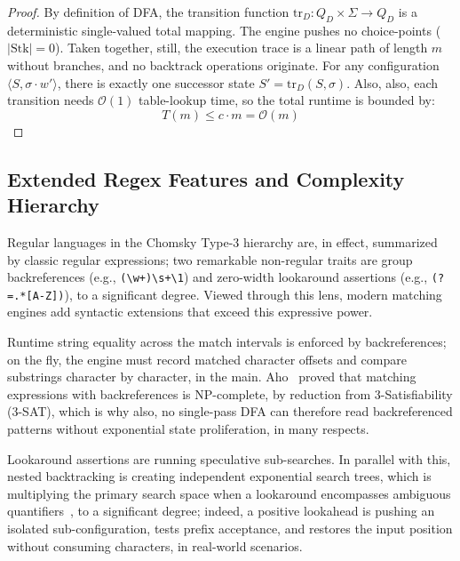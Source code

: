 \documentclass{ieeeaccess}
\begin{document}
\begin{proof}
By definition of DFA, the transition function $\mathrm{tr}_D: Q_D \times \Sigma \to Q_D$ is a deterministic single-valued total mapping. The engine pushes no choice-points ($|\mathrm{Stk}| = 0$). Taken together, still, the execution trace is a linear path of length $m$ without branches, and no backtrack operations originate. For any configuration $\langle S, \sigma \cdot w' \rangle$, there is exactly one successor state $S' = \mathrm{tr}_D(S, \sigma)$. Also, also, each transition needs $\mathcal{O}(1)$ table-lookup time, so the total runtime is bounded by:
\begin{equation}\label{eq:dfa_linear_runtime}
T(m) \le c \cdot m = \mathcal{O}(m)
\end{equation}
\end{proof}

\subsection{Extended Regex Features and Complexity Hierarchy}
Regular languages in the Chomsky Type-3 hierarchy are, in effect, summarized by classic regular expressions; two remarkable non-regular traits are group backreferences (e.g., \texttt{(\textbackslash w+)\textbackslash s+\textbackslash 1}) and zero-width lookaround assertions (e.g., \texttt{(?=.*[A-Z])}), to a significant degree. Viewed through this lens, modern matching engines add syntactic extensions that exceed this expressive power.

Runtime string equality across the match intervals is enforced by backreferences; on the fly, the engine must record matched character offsets and compare substrings character by character, in the main. Aho~\cite{aho1990algorithms} proved that matching expressions with backreferences is NP-complete, by reduction from 3-Satisfiability (3-SAT), which is why also, no single-pass DFA can therefore read backreferenced patterns without exponential state proliferation, in many respects.

Lookaround assertions are running speculative sub-searches. In parallel with this, nested backtracking is creating independent exponential search trees, which is multiplying the primary search space when a lookaround encompasses ambiguous quantifiers~\cite{chida2022repairing}, to a significant degree; indeed, a positive lookahead is pushing an isolated sub-configuration, tests prefix acceptance, and restores the input position without consuming characters, in real-world scenarios.
\end{document}
